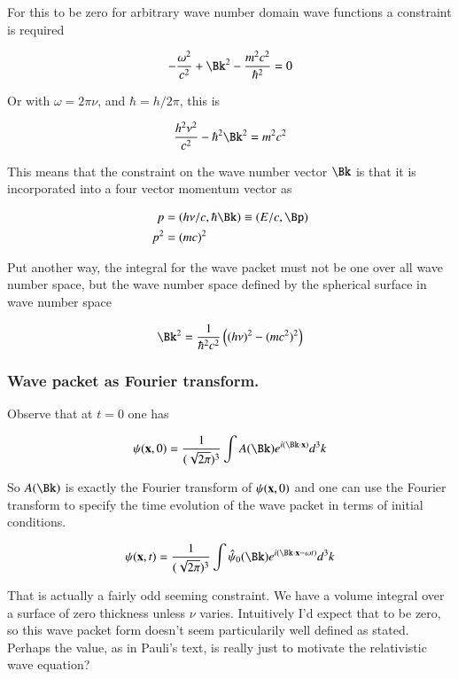 \documentclass{article}
\begin{document}
For this to be zero for arbitrary wave number domain wave functions a constraint is required

\begin{align*}
-\frac{\omega^2}{c^2} + \Bk^2 - \frac{m^2 c^2}{\hbar^2} = 0
\end{align*}

Or with $\omega = 2 \pi \nu$, and $\hbar = h/2\pi$, this is

\begin{align*}
\frac{h^2 \nu^2}{c^2} - \hbar^2 \Bk^2 = {m^2 c^2}
\end{align*}

This means that the constraint on the wave number vector $\Bk$ is that it is incorporated into a four vector momentum vector as

\begin{align*}
p &= (h \nu/c, \hbar \Bk) \equiv (E/c, \Bp)\\
p^2 &= (m c)^2
\end{align*}

Put another way, the integral for the wave packet must not be one over all wave number space, but the wave number space defined by the 
spherical surface in wave number space

\begin{align*}
\Bk^2 = \inv{\hbar^2 c^2 }\left( (h \nu)^2 - (m c^2)^2 \right)
\end{align*}

\subsubsection{ Wave packet as Fourier transform. }

Observe that at $t=0$ one has

\begin{align*}
\psi(\Bx,0) = \inv{(\sqrt{2\pi})^3}\int A(\Bk) e^{ i (\Bk \cdot \Bx)} d^3 k
\end{align*}

So $A(\Bk)$ is exactly the Fourier transform of $\psi(\mathbf{x},0)$ 
and one can
use the Fourier transform to specify the time evolution of the wave packet in terms of initial conditions.

\begin{align}
\psi(\Bx,t) = \inv{(\sqrt{2\pi})^3}\int \hat{\psi}_0(\Bk) e^{ i (\Bk \cdot \Bx - \omega t)} d^3 k
\end{align}

That is actually a fairly odd seeming constraint.  We have a volume integral over a surface of zero thickness unless $\nu$ varies.  Intuitively
I'd expect that to be zero, so this wave packet form doesn't seem particularily well defined as stated.  Perhaps the value, as
in Pauli's text, is really just to motivate the relativistic wave equation?
\end{document}
